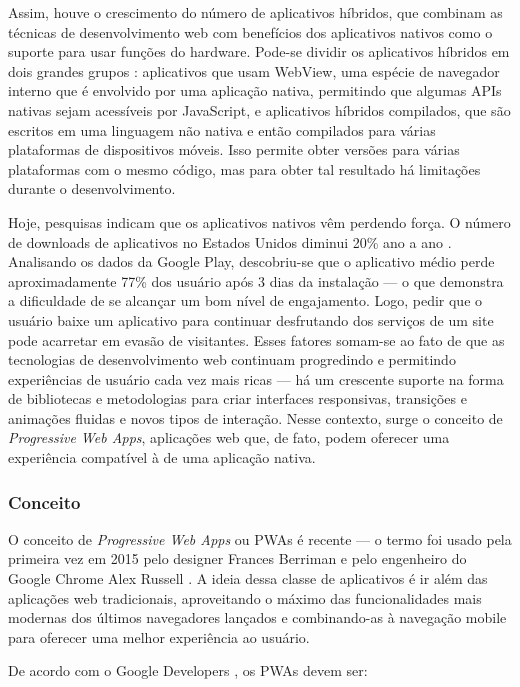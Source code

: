 Assim, houve o crescimento do número de aplicativos híbridos, que combinam as técnicas de desenvolvimento web com benefícios dos aplicativos nativos como o suporte para usar funções do hardware. Pode-se dividir os aplicativos híbridos em dois grandes grupos \cite{rudolph}: aplicativos que usam WebView, uma espécie de navegador interno que é envolvido por uma aplicação nativa, permitindo que algumas APIs nativas sejam acessíveis por JavaScript, e aplicativos híbridos compilados, que são escritos em uma linguagem não nativa e então compilados para várias plataformas de dispositivos móveis. Isso permite obter versões para várias plataformas com o mesmo código, mas para obter tal resultado há limitações durante o desenvolvimento.

Hoje, pesquisas indicam que os aplicativos nativos vêm perdendo força. O número de downloads de aplicativos no Estados Unidos diminui 20\% ano a ano \cite{benson}. Analisando os dados da Google Play, descobriu-se que o aplicativo médio perde aproximadamente 77\% dos usuário após 3 dias da instalação \cite{chen} --- o que demonstra a dificuldade de se alcançar um bom nível de engajamento. Logo, pedir que o usuário baixe um aplicativo para continuar desfrutando dos serviços de um site pode acarretar em evasão de visitantes. Esses fatores somam-se ao fato de que as tecnologias de desenvolvimento web continuam progredindo e permitindo experiências de usuário cada vez mais ricas --- há um crescente suporte na forma de bibliotecas e metodologias para criar interfaces responsivas, transições e animações fluidas e novos tipos de interação. Nesse contexto, surge o conceito de \textit{Progressive Web Apps}, aplicações web que, de fato, podem oferecer uma experiência compatível à de uma aplicação nativa.

\subsubsection{Conceito}
O conceito de \textit{Progressive Web Apps} ou PWAs é recente --- o termo foi usado pela primeira vez em 2015 pelo designer Frances Berriman e pelo engenheiro do Google Chrome Alex Russell \cite{russell}. A ideia dessa classe de aplicativos é ir além das aplicações web tradicionais, aproveitando o máximo das funcionalidades mais modernas dos últimos navegadores lançados e combinando-as à navegação mobile para oferecer uma melhor experiência ao usuário.

De acordo com o Google Developers \cite{googledevpwa}, os PWAs devem ser:

